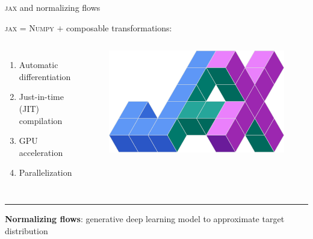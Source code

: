 \documentclass[usenames,dvipsnames,t]{beamer}
\begin{document}
\begin{frame}{\textsc{jax} and normalizing flows}

  \def\x{4mm}
  \def\y{2mm}
  \def\z{0.75cm}
  
  
  
  \textsc{jax} = \textsc{Numpy} $+$ composable transformations: 
  \begin{columns}
    \begin{enumerate}
      \item Automatic differentiation
      
      \vspace{\x}
      
      \item Just-in-time (JIT) compilation
      
      \vspace{\x}
      
      \item GPU acceleration
      
      \vspace{\x}
      
      \item Parallelization
  \end{enumerate}
  \begin{figure}
    \includegraphics[width=\textwidth]{Figures/jax.png}
  \end{figure}
\end{columns}

\vspace{\z}
\hrule 
\vspace{\z}


\textbf{Normalizing flows}: generative deep learning model to approximate target distribution

\end{frame}  
\end{document}
